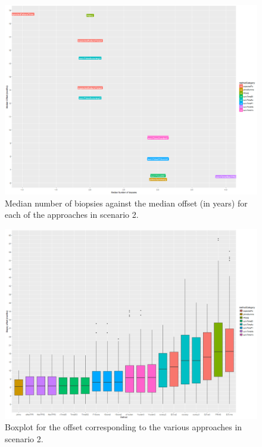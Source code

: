 \begin{figure}[H]
\centering
\captionsetup{justification=centering}
\includegraphics[width=\textwidth]{sim_study_res_sc_6_sh_1pt5/median_offsetvsnb.png}
\caption{\label{fig : sc_6_sh_1pt5_median_offsetvsnb}Median number of biopsies against the median offset (in years) for each of the approaches in scenario 2.}
\end{figure}

\begin{figure}[H]
\centering
\captionsetup{justification=centering}
\includegraphics[width=\textwidth]{sim_study_res_sc_6_sh_1pt5/offset_boxplot.png}
\caption{\label{fig : sc_6_sh_1pt5_offset_boxplot} Boxplot for the offset corresponding to the various approaches in scenario 2.}
\end{figure}


